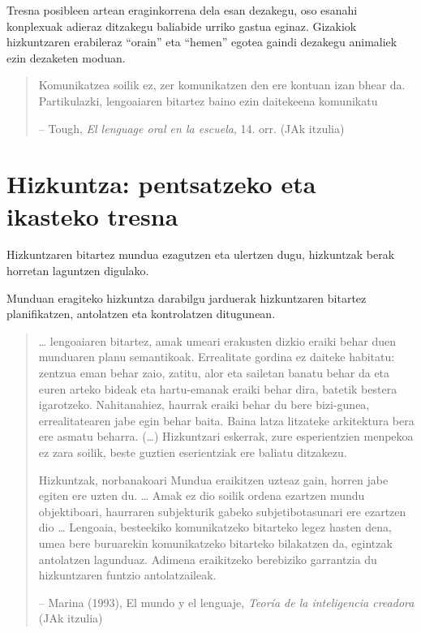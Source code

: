 \documentclass[
]{book}
\begin{document}
Tresna posibleen artean eraginkorrena dela esan dezakegu, oso esanahi konplexuak adieraz ditzakegu baliabide urriko gastua eginaz. Gizakiok hizkuntzaren erabileraz ``orain'' eta ``hemen'' egotea gaindi dezakegu animaliek ezin dezaketen moduan.

\begin{quote}
Komunikatzea soilik ez, zer komunikatzen den ere kontuan izan bhear da. Partikulazki, lengoaiaren bitartez baino ezin daitekeena komunikatu

-- Tough, \emph{El lenguage oral en la escuela}, 14. orr. (JAk itzulia)
\end{quote}

\hypertarget{hizkuntza-pentsatzeko-eta-ikasteko-tresna}{%
\section{Hizkuntza: pentsatzeko eta ikasteko tresna}\label{hizkuntza-pentsatzeko-eta-ikasteko-tresna}}

Hizkuntzaren bitartez mundua ezagutzen eta ulertzen dugu, hizkuntzak berak horretan laguntzen digulako.

Munduan eragiteko hizkuntza darabilgu jarduerak hizkuntzaren bitartez planifikatzen, antolatzen eta kontrolatzen ditugunean.

\begin{quote}
\ldots{} lengoaiaren bitartez, amak umeari erakusten dizkio eraiki behar duen munduaren planu semantikoak. Errealitate gordina ez daiteke habitatu: zentzua eman behar zaio, zatitu, alor eta sailetan banatu behar da eta euren arteko bideak eta hartu-emanak eraiki behar dira, batetik bestera igarotzeko. Nahitanahiez, haurrak eraiki behar du bere bizi-gunea, errealitatearen jabe egin behar baita. Baina latza litzateke arkitektura bera ere asmatu beharra. (\ldots) Hizkuntzari eskerrak, zure esperientzien menpekoa ez zara soilik, beste guztien eserientziak ere baliatu ditzakezu.

Hizkuntzak, norbanakoari Mundua eraikitzen uzteaz gain, horren jabe egiten ere uzten du. \ldots{} Amak ez dio soilik ordena ezartzen mundu objektiboari, haurraren subjekturik gabeko subjetibotasunari ere ezartzen dio \ldots{} Lengoaia, besteekiko komunikatzeko bitarteko legez hasten dena, umea bere buruarekin komunikatzeko bitarteko bilakatzen da, egintzak antolatzen lagunduaz. Adimena eraikitzeko berebiziko garrantzia du hizkuntzaren funtzio antolatzaileak.

-- Marina (1993), El mundo y el lenguaje, \emph{Teoría de la inteligencia creadora} (JAk itzulia)
\end{quote}
\end{document}
